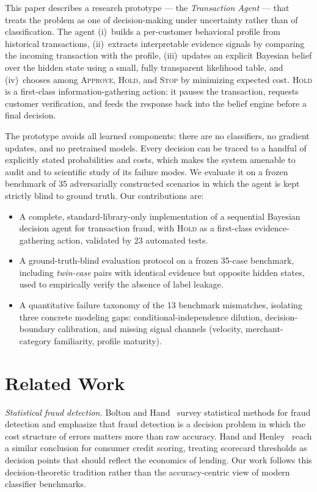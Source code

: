 \documentclass{article}
\begin{document}
This paper describes a research prototype --- the \emph{Transaction Agent} ---
that treats the problem as one of decision-making under uncertainty rather
than of classification. The agent (i)~builds a per-customer behavioral profile
from historical transactions, (ii)~extracts interpretable evidence signals by
comparing the incoming transaction with the profile, (iii)~updates an explicit
Bayesian belief over the hidden state using a small, fully transparent
likelihood table, and (iv)~chooses among \textsc{Approve}, \textsc{Hold}, and
\textsc{Stop} by minimizing expected cost. \textsc{Hold} is a first-class
information-gathering action: it pauses the transaction, requests customer
verification, and feeds the response back into the belief engine before a
final decision.

The prototype avoids all learned components: there are no classifiers, no
gradient updates, and no pretrained models. Every decision can be traced to a
handful of explicitly stated probabilities and costs, which makes the system
amenable to audit and to scientific study of its failure modes. We evaluate it
on a frozen benchmark of 35 adversarially constructed scenarios in which the
agent is kept strictly blind to ground truth. Our contributions are:

\begin{itemize}
  \item A complete, standard-library-only implementation of a sequential
  Bayesian decision agent for transaction fraud, with \textsc{Hold} as a
  first-class evidence-gathering action, validated by 23 automated tests.
  \item A ground-truth-blind evaluation protocol on a frozen 35-case benchmark,
  including \emph{twin-case} pairs with identical evidence but opposite hidden
  states, used to empirically verify the absence of label leakage.
  \item A quantitative failure taxonomy of the 13 benchmark mismatches,
  isolating three concrete modeling gaps: conditional-independence dilution,
  decision-boundary calibration, and missing signal channels (velocity,
  merchant-category familiarity, profile maturity).
\end{itemize}

\section{Related Work}

\emph{Statistical fraud detection.} Bolton and Hand~\cite{bolton2002} survey
statistical methods for fraud detection and emphasize that fraud detection is
a decision problem in which the cost structure of errors matters more than raw
accuracy. Hand and Henley~\cite{hand1997} reach a similar conclusion for
consumer credit scoring, treating scorecard thresholds as decision points that
should reflect the economics of lending. Our work follows this decision-theoretic
tradition rather than the accuracy-centric view of modern classifier benchmarks.
\end{document}
